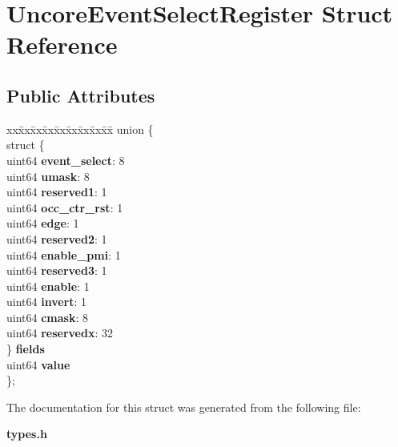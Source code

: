 \section{Uncore\+Event\+Select\+Register Struct Reference}
\label{structUncoreEventSelectRegister}
\subsection*{Public Attributes}
\begin{DoxyCompactItemize}
\item 
\begin{tabbing}
xx\=xx\=xx\=xx\=xx\=xx\=xx\=xx\=xx\=\kill
union \{\\
\>struct \{\\
\>\>uint64 {\bfseries event\_select}: 8\\
\>\>uint64 {\bfseries umask}: 8\\
\>\>uint64 {\bfseries reserved1}: 1\\
\>\>uint64 {\bfseries occ\_ctr\_rst}: 1\\
\>\>uint64 {\bfseries edge}: 1\\
\>\>uint64 {\bfseries reserved2}: 1\\
\>\>uint64 {\bfseries enable\_pmi}: 1\\
\>\>uint64 {\bfseries reserved3}: 1\\
\>\>uint64 {\bfseries enable}: 1\\
\>\>uint64 {\bfseries invert}: 1\\
\>\>uint64 {\bfseries cmask}: 8\\
\>\>uint64 {\bfseries reservedx}: 32\\
\>\} {\bfseries fields}\\
\>uint64 {\bfseries value}\\
\}; \label{structUncoreEventSelectRegister_a4d0fa3c570e3a77385919505792bacd8}
\\

\end{tabbing}\end{DoxyCompactItemize}


The documentation for this struct was generated from the following file\+:\begin{DoxyCompactItemize}
\item 
{\bf types.\+h}\end{DoxyCompactItemize}
